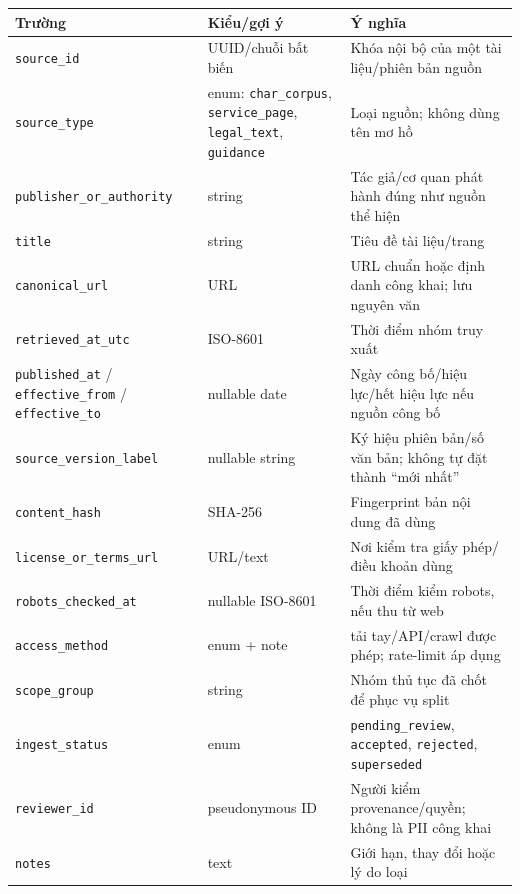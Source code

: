 \documentclass[11pt,a4paper]{article}
\begin{document}
{\def\LTcaptype{none} %
\begin{longtable}[]{@{}
  >{\raggedright\arraybackslash}p{}
  >{\raggedright\arraybackslash}p{}
  >{\raggedright\arraybackslash}p{}@{}}
\toprule\noalign{}
\begin{minipage}[b]{\linewidth}\raggedright
Trường
\end{minipage} & \begin{minipage}[b]{\linewidth}\raggedright
Kiểu/gợi ý
\end{minipage} & \begin{minipage}[b]{\linewidth}\raggedright
Ý nghĩa
\end{minipage} \\
\midrule\noalign{}
\endhead
\bottomrule\noalign{}
\endlastfoot
\nolinkurl{source_id} & UUID/chuỗi bất biến & Khóa nội bộ của một tài
liệu/phiên bản nguồn \\
\nolinkurl{source_type} & enum: \nolinkurl{char_corpus},
\nolinkurl{service_page}, \nolinkurl{legal_text}, \nolinkurl{guidance} &
Loại nguồn; không dùng tên mơ hồ \\
\nolinkurl{publisher_or_authority} & string & Tác giả/cơ quan phát hành
đúng như nguồn thể hiện \\
\nolinkurl{title} & string & Tiêu đề tài liệu/trang \\
\nolinkurl{canonical_url} & URL & URL chuẩn hoặc định danh công khai;
lưu nguyên văn \\
\nolinkurl{retrieved_at_utc} & ISO-8601 & Thời điểm nhóm truy xuất \\
\nolinkurl{published_at} / \nolinkurl{effective_from} /
\nolinkurl{effective_to} & nullable date & Ngày công bố/hiệu lực/hết
hiệu lực nếu nguồn công bố \\
\nolinkurl{source_version_label} & nullable string & Ký hiệu phiên
bản/số văn bản; không tự đặt thành ``mới nhất'' \\
\nolinkurl{content_hash} & SHA-256 & Fingerprint bản nội dung đã dùng \\
\nolinkurl{license_or_terms_url} & URL/text & Nơi kiểm tra giấy
phép/điều khoản dùng \\
\nolinkurl{robots_checked_at} & nullable ISO-8601 & Thời điểm kiểm
robots, nếu thu từ web \\
\nolinkurl{access_method} & enum + note & tải tay/API/crawl được phép;
rate-limit áp dụng \\
\nolinkurl{scope_group} & string & Nhóm thủ tục đã chốt để phục vụ
split \\
\nolinkurl{ingest_status} & enum & \nolinkurl{pending_review},
\nolinkurl{accepted}, \nolinkurl{rejected}, \nolinkurl{superseded} \\
\nolinkurl{reviewer_id} & pseudonymous ID & Người kiểm provenance/quyền;
không là PII công khai \\
\nolinkurl{notes} & text & Giới hạn, thay đổi hoặc lý do loại \\
\end{longtable}
}
\end{document}
